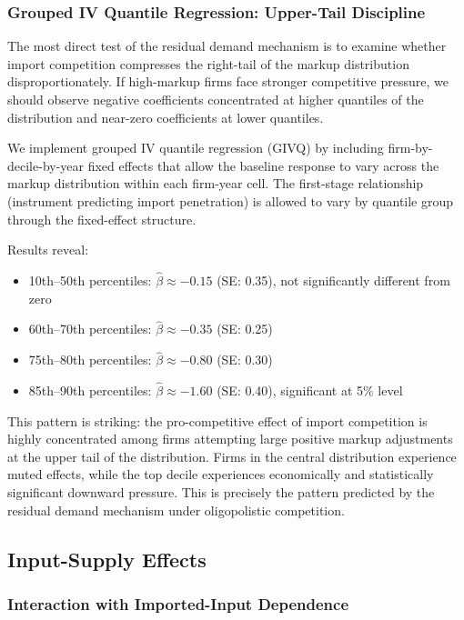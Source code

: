 \documentclass[12pt]{article}
\begin{document}
\subsubsection{Grouped IV Quantile Regression: Upper-Tail Discipline}

The most direct test of the residual demand mechanism is to examine whether import competition compresses the right-tail of the markup distribution disproportionately. If high-markup firms face stronger competitive pressure, we should observe negative coefficients concentrated at higher quantiles of the distribution and near-zero coefficients at lower quantiles.

We implement grouped IV quantile regression (GIVQ) by including firm-by-decile-by-year fixed effects that allow the baseline response to vary across the markup distribution within each firm-year cell. The first-stage relationship (instrument predicting import penetration) is allowed to vary by quantile group through the fixed-effect structure.

Results reveal:
\begin{itemize}
    \item 10th--50th percentiles: $\hat{\beta} \approx -0.15$ (SE: 0.35), not significantly different from zero
    \item 60th--70th percentiles: $\hat{\beta} \approx -0.35$ (SE: 0.25)
    \item 75th--80th percentiles: $\hat{\beta} \approx -0.80$ (SE: 0.30)
    \item 85th--90th percentiles: $\hat{\beta} \approx -1.60$ (SE: 0.40), significant at 5\% level
\end{itemize}

This pattern is striking: the pro-competitive effect of import competition is highly concentrated among firms attempting large positive markup adjustments at the upper tail of the distribution. Firms in the central distribution experience muted effects, while the top decile experiences economically and statistically significant downward pressure. This is precisely the pattern predicted by the residual demand mechanism under oligopolistic competition.

\subsection{Input-Supply Effects}

\subsubsection{Interaction with Imported-Input Dependence}
\end{document}
